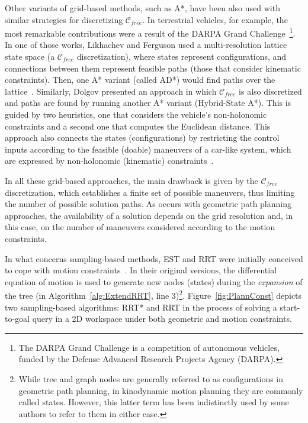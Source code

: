 Other variants of grid-based methods, such as A*, have been also used with
similar strategies for discretizing $\mathcal{C}_{free}$. In terrestrial
vehicles, for example, the most remarkable contributions were a result of the
DARPA Grand Challenge~\cite{Thrun2006}\footnote{The DARPA Grand Challenge is a
competition of autonomous vehicles, funded by the Defense Advanced Research
Projects Agency (DARPA).}. In one of those works, Likhachev and Ferguson used a
multi-resolution lattice state space (a $\mathcal{C}_{free}$ discretization),
where states represent configurations, and connections between them represent
feasible paths (\ie those that consider kinematic constraints).
Then, one A* variant (called AD*) would find paths over the
lattice~\cite{Likhachev2009}. Similarly, Dolgov \etal presented an approach in
which $\mathcal{C}_{free}$ is also discretized and paths are found by running
another A* variant (Hybrid-State A*). This is guided by two heuristics, one that
considers the vehicle's non-holonomic constraints and a second one that computes
the Euclidean distance. This approach also connects the states (configurations)
by restricting the control inputs according to the feasible (doable) maneuvers
of a car-like system, which are expressed by non-holonomic (kinematic)
constraints~\cite{Dolgov2008,Dolgov2010}.

In all these grid-based approaches, the main drawback is given by the
$\mathcal{C}_{free}$ discretization, which establishes a finite set of possible
maneuvers, thus limiting the number of possible solution paths. As occurs with
geometric path planning approaches, the availability of a solution depends on
the grid resolution and, in this case, on the number of maneuvers considered
according to the motion constraints.

In what concerns sampling-based methods, \ac{EST} and \ac{RRT} were initially
conceived to cope with motion constraints~\cite{Hsu2002,LaValle2001}. In their
original versions, the differential equation of motion is used to generate new
nodes (states) during the \textit{expansion} of the tree (\eg in
Algorithm~\ref{alg:ExtendRRT}, line 3)\footnote{While tree and graph nodes are
generally referred to as configurations in geometric path planning, in
kinodynamic motion planning they are commonly called states. However, this
latter term has been indistinctly used by some authors to refer to them in
either case.}. Figure~\ref{fig:PlannConst} depicts two sampling-based
algorithms: \ac{RRT*} and \ac{RRT} in the process of solving a start-to-goal
query in a \ac{2D} workspace under both geometric and motion constraints.

